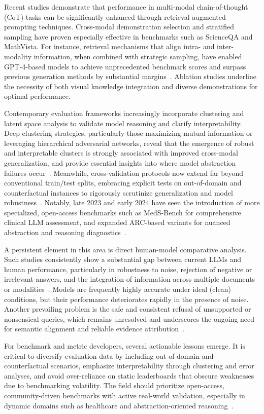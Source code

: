 \documentclass[sigconf]{acmart}
\begin{document}
Recent studies demonstrate that performance in multi-modal chain-of-thought (CoT) tasks can be significantly enhanced through retrieval-augmented prompting techniques. Cross-modal demonstration selection and stratified sampling have proven especially effective in benchmarks such as ScienceQA and MathVista. For instance, retrieval mechanisms that align intra- and inter-modality information, when combined with strategic sampling, have enabled GPT-4-based models to achieve unprecedented benchmark scores and surpass previous generation methods by substantial margins~\cite{ref85}. Ablation studies underline the necessity of both visual knowledge integration and diverse demonstrations for optimal performance.

Contemporary evaluation frameworks increasingly incorporate clustering and latent space analysis to validate model reasoning and clarify interpretability. Deep clustering strategies, particularly those maximizing mutual information or leveraging hierarchical adversarial networks, reveal that the emergence of robust and interpretable clusters is strongly associated with improved cross-modal generalization, and provide essential insights into where model abstraction failures occur~\cite{ref79}. Meanwhile, cross-validation protocols now extend far beyond conventional train/test splits, embracing explicit tests on out-of-domain and counterfactual instances to rigorously scrutinize generalization and model robustness~\cite{ref94,ref95}. Notably, late 2023 and early 2024 have seen the introduction of more specialized, open-access benchmarks such as MedS-Bench for comprehensive clinical LLM assessment, and expanded ARC-based variants for nuanced abstraction and reasoning diagnostics~\cite{ref92,ref95}.

A persistent element in this area is direct human-model comparative analysis. Such studies consistently show a substantial gap between current LLMs and human performance, particularly in robustness to noise, rejection of negative or irrelevant answers, and the integration of information across multiple documents or modalities~\cite{ref92,ref94,ref95}. Models are frequently highly accurate under ideal (clean) conditions, but their performance deteriorates rapidly in the presence of noise. Another prevailing problem is the safe and consistent refusal of unsupported or nonsensical queries, which remains unresolved and underscores the ongoing need for semantic alignment and reliable evidence attribution~\cite{ref94,ref95}.

For benchmark and metric developers, several actionable lessons emerge. It is critical to diversify evaluation data by including out-of-domain and counterfactual scenarios, emphasize interpretability through clustering and error analyses, and avoid over-reliance on static leaderboards that obscure weaknesses due to benchmarking volatility. The field should prioritize open-access, community-driven benchmarks with active real-world validation, especially in dynamic domains such as healthcare and abstraction-oriented reasoning~\cite{ref92,ref94,ref95}.
\end{document}
